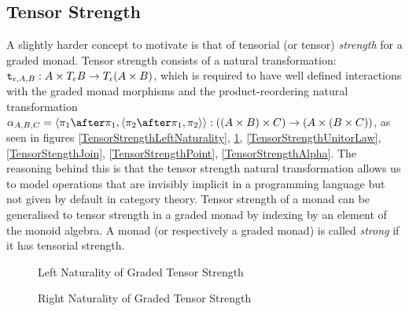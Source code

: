 \documentclass{Report}
\begin{document}
\subsection{Tensor Strength}
A slightly harder concept to motivate is that of tensorial (or tensor) \textit{strength} for a graded monad. Tensor strength consists of a natural transformation: $\texttt{t}_{\epsilon, A, B}: A \times T_{\epsilon}{B} \rightarrow T_{\epsilon}{(A \times B)}$, which is required to have well defined interactions with the graded monad morphisms and the product-reordering natural transformation $\alpha_{A, B, C} = \pr{\p\after\p}{\pr{\pp\after\p}{\pp}}: ((A \times B) \times C) \rightarrow (A \times (B \times C))$, as seen in figures \ref{TensorStrengthLeftNaturality}, \ref{TensorStrengthRightNaturality}, \ref{TensorStrengthUnitorLaw}, \ref{TensorStengthJoin}, \ref{TensorStrengthPoint}, \ref{TensorStrengthAlpha}. The reasoning behind this is that the tensor strength natural transformation allows us to model operations that are invisibly implicit in a programming language but not given by default in category theory. Tensor strength of a monad can be generalised to tensor strength in a graded monad by indexing by an element of the monoid algebra. A monad (or respectively a graded monad) is called \textit{strong} if it has tensorial strength. 

\begin{figure}
\begin{framed}
        \centering
        \begin{minipage}{0.45\textwidth}
            \centering
                \caption{Left Naturality of Graded Tensor Strength}
                \label{TensorStrengthLeftNaturality}
        \end{minipage}
        \hfill
        \begin{minipage}{0.45\textwidth}
            \centering
            \caption{Right Naturality of Graded Tensor Strength}
            \label{TensorStrengthRightNaturality}
        \end{minipage} 
\end{framed}
\end{figure}
\end{document}

